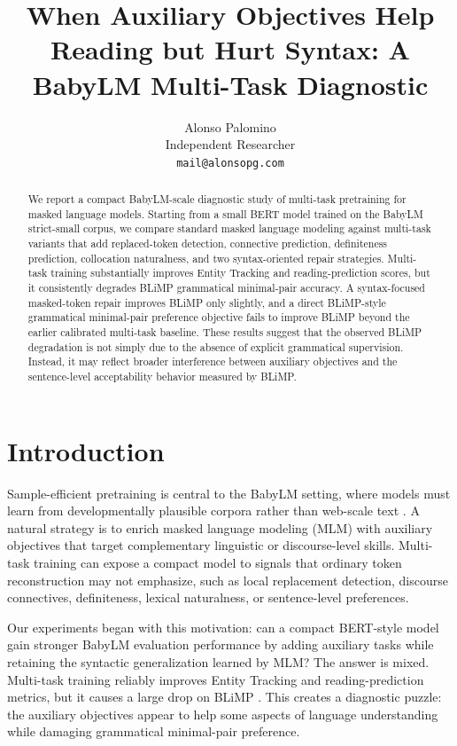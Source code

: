 \documentclass[11pt]{article}
\title{When Auxiliary Objectives Help Reading but Hurt Syntax: A BabyLM Multi-Task Diagnostic}
\author{
  Alonso Palomino \\
  Independent Researcher \\
  \texttt{mail@alonsopg.com}
}
\begin{document}
\maketitle

\begin{abstract}
We report a compact BabyLM-scale diagnostic study of multi-task pretraining for masked language models. Starting from a small BERT model trained on the BabyLM strict-small corpus, we compare standard masked language modeling against multi-task variants that add replaced-token detection, connective prediction, definiteness prediction, collocation naturalness, and two syntax-oriented repair strategies. Multi-task training substantially improves Entity Tracking and reading-prediction scores, but it consistently degrades BLiMP grammatical minimal-pair accuracy. A syntax-focused masked-token repair improves BLiMP only slightly, and a direct BLiMP-style grammatical minimal-pair preference objective fails to improve BLiMP beyond the earlier calibrated multi-task baseline. These results suggest that the observed BLiMP degradation is not simply due to the absence of explicit grammatical supervision. Instead, it may reflect broader interference between auxiliary objectives and the sentence-level acceptability behavior measured by BLiMP.
\end{abstract}

\section{Introduction}

Sample-efficient pretraining is central to the BabyLM setting, where models must learn from developmentally plausible corpora rather than web-scale text \citep{warstadt2023babylm,hu2024babylm}. A natural strategy is to enrich masked language modeling (MLM) with auxiliary objectives that target complementary linguistic or discourse-level skills. Multi-task training can expose a compact model to signals that ordinary token reconstruction may not emphasize, such as local replacement detection, discourse connectives, definiteness, lexical naturalness, or sentence-level preferences.

Our experiments began with this motivation: can a compact BERT-style model gain stronger BabyLM evaluation performance by adding auxiliary tasks while retaining the syntactic generalization learned by MLM? The answer is mixed. Multi-task training reliably improves Entity Tracking and reading-prediction metrics, but it causes a large drop on BLiMP \citep{warstadt2020blimp}. This creates a diagnostic puzzle: the auxiliary objectives appear to help some aspects of language understanding while damaging grammatical minimal-pair preference.
\end{document}
